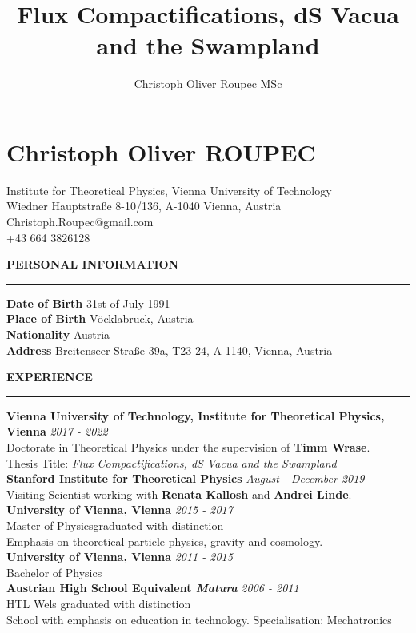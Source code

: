 \documentclass[a4paper,12pt]{report}
\title{Flux Compactifications, dS Vacua and the Swampland}
\author{Christoph Oliver Roupec MSc}
\newenvironment{rSection}[1]{ %
  \sectionskip
  \MakeUppercase{\bf #1} %
  \sectionlineskip
  \hrule %
  \begin{list}{}{ %
    \setlength{\leftmargin}{1.5em} %
  }
  \item[]
}{
  \end{list}
}
\def\sectionlineskip{\medskip} %
\def\sectionskip{\medskip} %
\begin{document}
\center
\section*{Christoph Oliver ROUPEC}
Institute for Theoretical Physics, Vienna University of Technology\\
Wiedner Hauptstraße 8-10/136, A-1040 Vienna, Austria\\
Christoph.Roupec@gmail.com\\
+43 664 3826128

\begin{rSection}{Personal Information}
      {\bf Date of Birth} \hfill { 31st of July 1991}
      \\{\bf Place of Birth} \hfill { Vöcklabruck, Austria}
      \\{\bf Nationality} \hfill { Austria}
      \\{\bf Address} \hfill {Breitenseer Straße 39a, T23-24, A-1140, Vienna, Austria}

\end{rSection}

\begin{rSection}{Experience}

      {\bf Vienna University of Technology, Institute for Theoretical Physics, Vienna} \hfill {\em 2017 - 2022} 
      \\ Doctorate in Theoretical Physics under the supervision of {\bf Timm Wrase}.
      \\ Thesis Title: \emph{Flux Compactifications, dS Vacua and the Swampland}\vspace{7pt}
      \\{\bf Stanford Institute for Theoretical Physics} \hfill {\em August - December 2019}
      \\ Visiting Scientist working with {\bf Renata Kallosh} and {\bf Andrei Linde}.
      \vspace{7pt}
      \\{\bf University of Vienna, Vienna} \hfill {\em 2015 - 2017} 
      \\ Master of Physics\hfill {graduated with distinction }
      \\ Emphasis on theoretical particle physics, gravity and cosmology.\vspace{7pt}
      \\ {\bf University of Vienna, Vienna} \hfill {\em 2011 - 2015}
      \\ Bachelor of Physics \vspace{7pt}
      \\ {\bf Austrian High School Equivalent \emph{Matura}} \hfill {\em 2006 - 2011}
      \\ HTL Wels \hfill {graduated with distinction}
      \\ School with emphasis on education in technology. Specialisation: Mechatronics
      
      \end{rSection}
\end{document}
